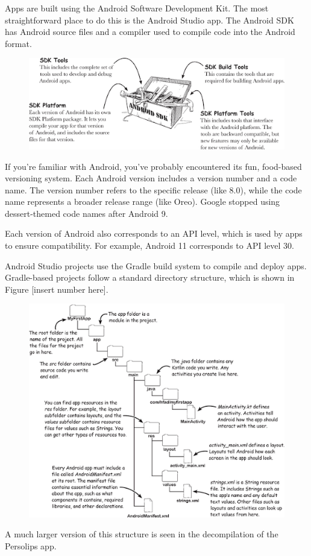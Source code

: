 Apps are built using the Android Software Development Kit. The most straightforward place to do this is the Android Studio app. The Android SDK has Android source files and a compiler used to compile code into the Android format.

\begin{figure}[H]
	\centering
	\includegraphics[width=0.7\linewidth]{android_sdk_tools.png}
	\caption{}
	\label{fig:androidsdktools}
\end{figure}

If you’re familiar with Android, you’ve probably encountered its fun, food-based versioning system. Each Android version includes a version number and a code name. The version number refers to the specific release (like 8.0), while the code name represents a broader release range (like Oreo). Google stopped using dessert-themed code names after Android 9.

Each version of Android also corresponds to an API level, which is used by apps to ensure compatibility. For example, Android 11 corresponds to API level 30.

Android Studio projects use the Gradle build system to compile and deploy apps. Gradle-based projects follow a standard directory structure, which is shown in Figure [insert number here].

\begin{figure}[H]
	\centering
	\includegraphics[width=0.7\linewidth]{gradle_build_structure.png}
	\caption{}
	\label{fig:gradlebuildstructure}
\end{figure}
A much larger version of this structure is seen in the decompilation of the Persolips app. 

